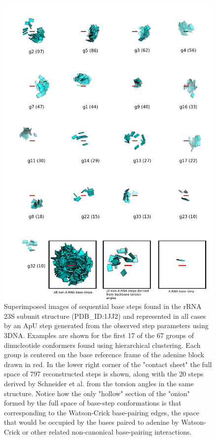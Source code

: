 \begin{figure}
\centering
\includegraphics[angle=0, scale=0.30]{Chapter2/k67_17.png}
\caption{Superimposed  images of  sequential base  steps found  in the
  rRNA  23S subunit  structure (PDB\_ID:1JJ2)  and represented  in all
  cases by  an ApU  step generated from  the observed  step parameters
  using 3DNA. Examples are shown for  the first 17 of the 67 groups of
  dinucleotide conformers  found using hierarchical  clustering.  Each
  group is centered  on the base reference frame  of the adenine block
  drawn in red.  In the lower  right corner of the "contact sheet" the
  full space  of 797 reconstructed steps  is shown, along  with the 20
  steps  derived by  Schneider et  al.  \cite{schneider2004}  from the
  torsion angles in the same  structure.  Notice how the only "hollow"
  section  of  the "onion"  formed  by  the  full space  of  base-step
  conformations is that corresponding to the Watson-Crick base-pairing
  edges,  the space  that would  be occupied  by the  bases  paired to
  adenine by Watson-Crick  or other related non-canonical base-pairing
  interactions.}
\label{fig:noarnak67}
\end{figure}

